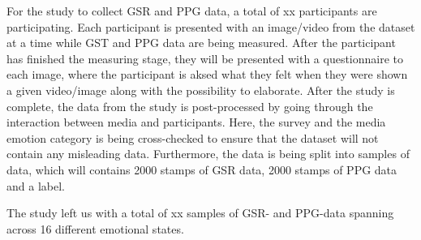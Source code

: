 For the study to collect GSR and PPG data, a total of xx participants are participating. Each participant is presented with an image/video from the dataset at a time while GST and PPG data are being measured. After the participant has finished the measuring stage, they will be presented with a questionnaire to each image, where the participant is aksed what they felt when they were shown a given video/image along with the possibility to elaborate. 
After the study is complete, the data from the study is post-processed by going through the interaction between media and participants. Here, the survey and the media emotion category is being cross-checked to ensure that the dataset will not contain any misleading data. Furthermore, the data is being split into samples of data, which will contains 2000 stamps of GSR data, 2000 stamps of PPG data and a label. 

The study left us with a total of xx samples of GSR- and PPG-data spanning across 16 different emotional states. 